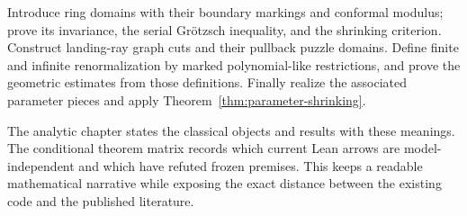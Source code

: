 \begin{formalobligation}
Introduce ring domains with their boundary markings and conformal modulus;
prove its invariance, the serial Grötzsch inequality, and the shrinking
criterion.  Construct landing-ray graph cuts and their pullback puzzle
domains.  Define finite and infinite renormalization by marked
polynomial-like restrictions, and prove the geometric estimates from
those definitions.  Finally realize the associated parameter pieces and
apply Theorem~\ref{thm:parameter-shrinking}.
\end{formalobligation}

The analytic chapter states the classical objects and results with these
meanings.  The conditional theorem matrix records which current Lean
arrows are model-independent and which have refuted frozen premises.
This keeps a readable mathematical narrative while exposing the exact
distance between the existing code and the published literature.
